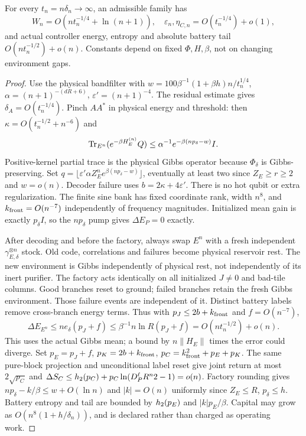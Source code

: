\begin{theorem}\label{kt:bp-noisesuff}
For every $t_n=n\delta_n\to\infty$, an admissible family has
\[
 W_n=O(nt_n^{-1/4}+\ln(n+1)),\quad
 \varepsilon_n,\eta_{C,n}=O(t_n^{-1/4})+o(1),
\]
and actual controller energy, entropy and absolute battery tail
$O(nt_n^{-1/2})+o(n)$. Constants depend on fixed $\Phi,H,\beta$,
not on changing environment gaps.
\end{theorem}
\begin{proof}
Use the physical bandfilter with
$w=100\beta^{-1}(1+\beta h)n/t_n^{1/4}$,
$\alpha=(n+1)^{-(dR+6)}$, $\varepsilon'=(n+1)^{-4}$.
The residual estimate gives $\delta_A=O(t_n^{-1/4})$.
Pinch $AA^*$ in physical energy and threshold: then
$\kappa=O(t_n^{-1/2}+n^{-6})$ and
\[
 \operatorname{Tr}_{E^n}(e^{-\beta H_E^{(n)}}Q)
       \le\alpha^{-1}e^{-\beta(np_\delta-w)}I.
\]
Positive-kernel partial trace is the physical Gibbs operator because
$\Phi_\delta$ is Gibbs-preserving. Set
$q=\lfloor\varepsilon'\alpha Z_E^n e^{\beta(np_\delta-w)}\rfloor$,
eventually at least two since $Z_E\ge r\ge2$ and $w=o(n)$.
Decoder failure uses $b=2\kappa+4\varepsilon'$.
There is no hot qubit or extra regularization. The finite sine bank
has fixed coordinate rank, width $n^8$, and
$k_{\rm front}=O(n^{-7})$ independently of frequency magnitudes.
Initialized mean gain is exactly $p_\delta I$, so the
$np_\delta$ pump gives $\Delta E_P=0$ exactly.

After decoding and before the factory, always swap $E^n$ with a
fresh independent $\gamma_{E,\delta}^{\otimes n}$ stock.
Old code, correlations and failures become physical reservoir rest.
The new environment is Gibbs independently of physical rest, not
independently of its inert purifier. The factory acts identically
on all initialized $J\ne0$ and bad-tile columns.
Good branches reset to ground; failed branches retain the fresh
Gibbs environment. Those failure events are independent of it.
Distinct battery labels remove cross-branch energy terms. Thus
with $p_J\le2b+k_{\rm front}$ and $f=O(n^{-7})$,
\[
 \Delta E_{E^n}\le ne_\delta(p_J+f)
      \le\beta^{-1}n\ln R(p_J+f)=O(nt_n^{-1/2})+o(n).
\]
This uses the actual Gibbs mean; a bound by
$n\|H_E\|$ times the error could diverge.
Set $p_E=p_J+f$, $p_K=2b+k_{\rm front}$,
$p_C=k_{\rm front}^2+p_E+p_K$.
The same pure-block projection and unconditional label reset give
joint return at most $2\sqrt{p_C}$ and
$\Delta S_C\le h_2(p_C)+p_C\ln(D_P^\ell R^n2-1)=o(n)$.
Factory rounding gives $np_\delta-k/\beta\le w+O(\ln n)$ and
$|k|=O(n)$ uniformly since $Z_E\le R$, $p_\delta\le h$.
Battery entropy and tail are bounded by $h_2(p_E)$ and $|k|p_E/\beta$.
Capital may grow as $O(n^8(1+h/\delta_n))$, and is declared rather
than charged as operating work.
\end{proof}

